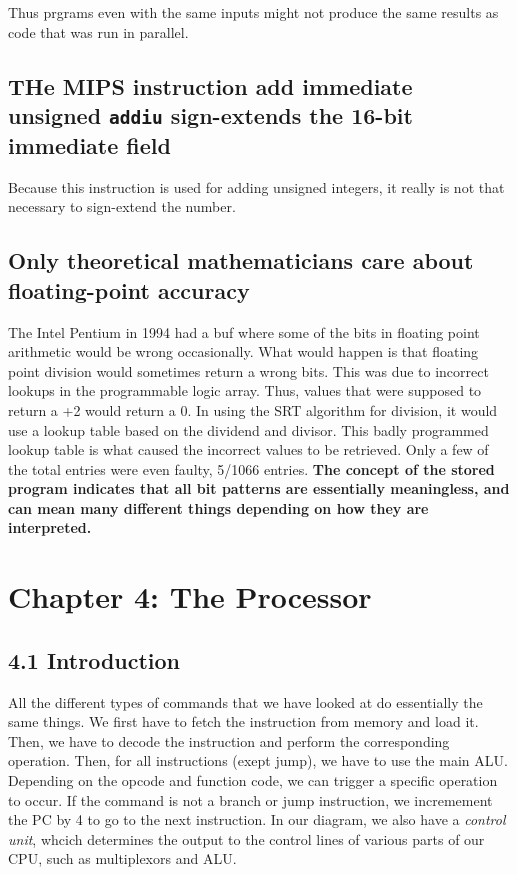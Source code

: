 \documentclass{article}
\begin{document}
Thus prgrams even with the same inputs might not produce the same results as code that was run in parallel.
\subsection{THe MIPS instruction add immediate unsigned \texttt{addiu} sign-extends the 16-bit immediate field}
Because this instruction is used for adding unsigned integers,  it really is not that necessary to sign-extend the
number.
\subsection{Only  theoretical mathematicians care about floating-point accuracy}
The Intel Pentium in 1994 had a buf where some of the bits in floating point arithmetic would be wrong occasionally.
What would happen is that floating point division would sometimes return a wrong bits. This was due to incorrect
lookups in the programmable logic array. Thus, values that were supposed to return a +2 would return a 0. In using 
the SRT algorithm for division, it would use a lookup table based on the dividend and divisor. This badly programmed
lookup table is what caused the incorrect values to be retrieved. Only a few of the total entries were even faulty,
5/1066 entries.
\textbf{The concept of the stored program indicates that all bit patterns are essentially meaningless, and can mean 
many different things depending on how they are interpreted.}
\newpage
\section{Chapter 4: The Processor}
\subsection{4.1 Introduction}
All the different types of commands that we have looked at do essentially the same things. We first have to fetch
the instruction from memory and load it. Then, we have to decode the instruction and perform the corresponding
operation. Then, for all instructions (exept jump), we have to use the main ALU. Depending on the opcode and
function code, we can trigger a specific operation to occur. If the command is not a branch or jump instruction,
we incremement the PC by 4 to go to the next instruction.  In our diagram, we also have a \textit{control unit},
whcich determines the output to the control lines of various parts of our CPU, such as multiplexors and ALU.
\end{document}
